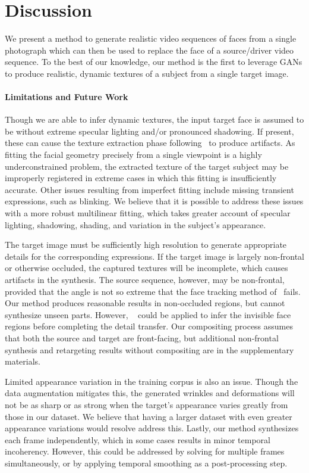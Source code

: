 
\section{Discussion}

We present a method to generate realistic video sequences of faces from a single photograph 
which can then be used to replace the face of a source/driver video sequence. To the best of our knowledge, our method is the first to leverage GANs to produce realistic, dynamic textures of a subject from a single target image.

\paragraph{Limitations and Future Work}
Though we are able to infer dynamic textures, the input target face is assumed to be without extreme specular lighting and/or pronounced shadowing. If present, these can cause the texture extraction phase following~\cite{f2f} to produce artifacts. As fitting the facial geometry precisely from a single viewpoint is a highly underconstrained problem, the extracted texture of the target subject may be improperly registered in extreme cases in which this fitting is insufficiently accurate. Other issues resulting from imperfect fitting include missing transient expressions, such as blinking. We believe that it is possible to address these issues with a more robust multilinear fitting, which takes greater account of specular lighting, shadowing, shading, and variation in the subject's appearance.   

The target image must be sufficiently high resolution to generate appropriate details for the corresponding expressions. If the target image is largely non-frontal or otherwise occluded, the captured textures will be incomplete, which causes artifacts in the synthesis. The source sequence, however, may be non-frontal, provided that the angle is not so extreme that the face tracking method of~\cite{f2f} fails. Our method produces reasonable results in non-occluded regions, but cannot synthesize unseen parts. However, ~\cite{saito2016} could be applied to infer the invisible face regions before completing the detail transfer. Our compositing process assumes that both the source and target are front-facing, but additional non-frontal synthesis and retargeting results without compositing are in the supplementary materials.  

Limited appearance variation in the training corpus is also an issue. Though the data augmentation mitigates this, the generated wrinkles and deformations will not be as sharp or as strong when the target's appearance varies greatly from those in our dataset. We believe that having a larger dataset with even greater appearance variations would resolve address this. Lastly, our method synthesizes each frame independently, which in some cases results in minor temporal incoherency. However, this could be addressed by solving for multiple frames simultaneously, or by applying temporal smoothing as a post-processing step.  


